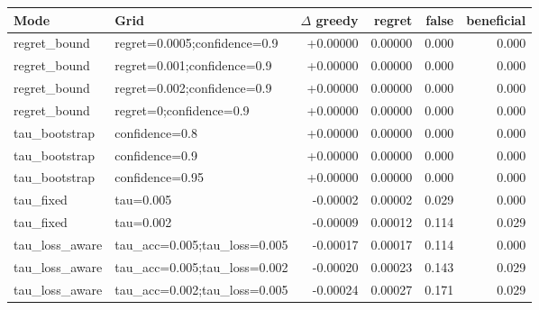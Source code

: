 \begin{tabular}{llrrrr}
\toprule
Mode & Grid & $\Delta$ greedy & regret & false & beneficial \\
\midrule
regret\_bound & regret=0.0005;confidence=0.9 & +0.00000 & 0.00000 & 0.000 & 0.000 \\
regret\_bound & regret=0.001;confidence=0.9 & +0.00000 & 0.00000 & 0.000 & 0.000 \\
regret\_bound & regret=0.002;confidence=0.9 & +0.00000 & 0.00000 & 0.000 & 0.000 \\
regret\_bound & regret=0;confidence=0.9 & +0.00000 & 0.00000 & 0.000 & 0.000 \\
tau\_bootstrap & confidence=0.8 & +0.00000 & 0.00000 & 0.000 & 0.000 \\
tau\_bootstrap & confidence=0.9 & +0.00000 & 0.00000 & 0.000 & 0.000 \\
tau\_bootstrap & confidence=0.95 & +0.00000 & 0.00000 & 0.000 & 0.000 \\
tau\_fixed & tau=0.005 & -0.00002 & 0.00002 & 0.029 & 0.000 \\
tau\_fixed & tau=0.002 & -0.00009 & 0.00012 & 0.114 & 0.029 \\
tau\_loss\_aware & tau\_acc=0.005;tau\_loss=0.005 & -0.00017 & 0.00017 & 0.114 & 0.000 \\
tau\_loss\_aware & tau\_acc=0.005;tau\_loss=0.002 & -0.00020 & 0.00023 & 0.143 & 0.029 \\
tau\_loss\_aware & tau\_acc=0.002;tau\_loss=0.005 & -0.00024 & 0.00027 & 0.171 & 0.029 \\
\bottomrule
\end{tabular}
